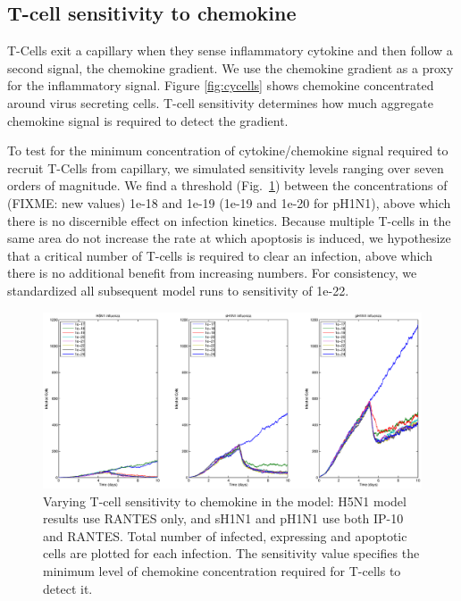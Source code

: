 \documentclass[10pt]{article}
\begin{document}
\subsection*{T-cell sensitivity to chemokine}

T-Cells exit a capillary when they sense inflammatory cytokine and then follow a second signal, the chemokine gradient.  We use the chemokine gradient as a proxy for the inflammatory signal.  Figure \ref{fig:cycells} shows chemokine concentrated around virus secreting cells.  T-cell sensitivity determines how much aggregate chemokine signal is required to detect the gradient.

To test for the minimum concentration of cytokine/chemokine signal required to recruit T-Cells from capillary, we simulated sensitivity levels ranging over seven orders of magnitude. We find a threshold (Fig.~\ref{fig:sensitivity}) between the concentrations of (FIXME: new values) 1e-18 and 1e-19 (1e-19 and 1e-20 for pH1N1), above which there is no discernible effect on infection kinetics.  Because multiple T-cells in the same area do not increase the rate at which  apoptosis is induced, we hypothesize that a critical number of T-cells is required to clear an infection, above which there is no additional benefit from increasing numbers.  For consistency, we standardized all subsequent model runs to  sensitivity of 1e-22.

\begin{figure}[ht!]
\begin{center}
 \includegraphics[width=\textwidth]{sensitivity}
 \end{center}
\caption{Varying T-cell sensitivity to chemokine in the model: H5N1 model results use RANTES  only, and sH1N1 and pH1N1 use both IP-10 and RANTES. Total number of infected, expressing and apoptotic cells are plotted for each infection.  The sensitivity value specifies the minimum level of chemokine concentration required for T-cells to detect it. } 
 \label{fig:sensitivity}
\end{figure}
\end{document}
